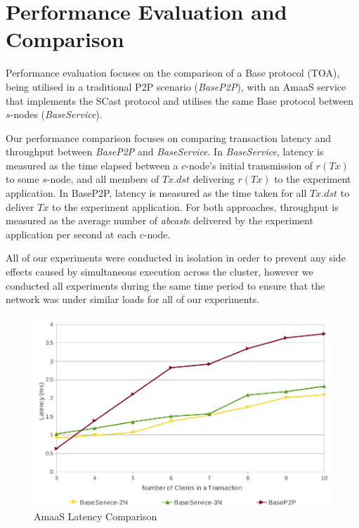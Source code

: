 \section{Performance Evaluation and Comparison}\label{sec:AmaaS_results}
Performance evaluation focuses on the comparison of a \textsf{Base} protocol (TOA), being utilised in a traditional P2P scenario (\emph{BaseP2P}), with an \textsf{AmaaS} service that implements the \textsf{SCast} protocol and utilises the same \textsf{Base} protocol between $s$-nodes (\emph{BaseService}).

Our performance comparison focuses on comparing transaction latency and throughput between \emph{BaseP2P} and \emph{BaseService}.  In \emph{BaseService}, latency is measured as the time elapsed between a $c$-node's initial transmission of $r(Tx)$ to some $s$-node, and all members of $Tx.dst$ delivering $r(Tx)$ to the experiment application. In BaseP2P, latency is measured as the time taken for all $Tx.dst$ to deliver $Tx$ to the experiment application. For both approaches, throughput is measured as the average number of \emph{abcast}s delivered by the experiment application per second at each $c$-node.

All of our experiments were conducted in isolation in order to prevent any side effects caused by simultaneous execution across the cluster, however we conducted all experiments during the same time period to ensure that the network was under similar loads for all of our experiments. 

\begin{figure}[htbp!]
 \includegraphics[width=\textwidth,height=\textheight,keepaspectratio]{Latency}
 \caption{AmaaS Latency Comparison}
 \label{fig:LatencyGraph}
\end{figure}

